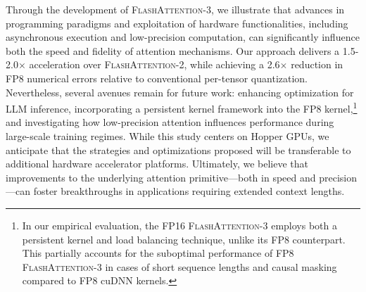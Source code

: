 Through the development of \textsc{FlashAttention-3}, we illustrate that advances in programming paradigms and exploitation of hardware functionalities, including asynchronous execution and low-precision computation, can significantly influence both the speed and fidelity of attention mechanisms. Our approach delivers a 1.5-2.0$\times$ acceleration over \textsc{FlashAttention-2}, while achieving a 2.6$\times$ reduction in FP8 numerical errors relative to conventional per-tensor quantization. Nevertheless, several avenues remain for future work: enhancing optimization for LLM inference, incorporating a persistent kernel framework into the FP8 kernel,\footnote{In our empirical evaluation, the FP16 \textsc{FlashAttention-3} employs both a persistent kernel and load balancing technique, unlike its FP8 counterpart. This partially accounts for the suboptimal performance of FP8 \textsc{FlashAttention-3} in cases of short sequence lengths and causal masking compared to FP8 cuDNN kernels.} and investigating how low-precision attention influences performance during large-scale training regimes. While this study centers on Hopper GPUs, we anticipate that the strategies and optimizations proposed will be transferable to additional hardware accelerator platforms. Ultimately, we believe that improvements to the underlying attention primitive—both in speed and precision—can foster breakthroughs in applications requiring extended context lengths.

